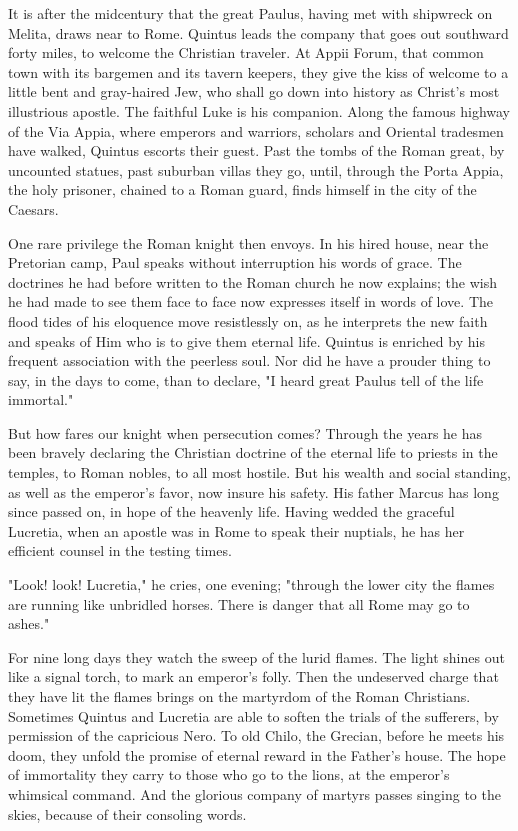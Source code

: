 It is after the midcentury that the great Paulus, having met with
shipwreck on Melita, draws near to Rome.  Quintus leads the company
that goes out southward forty miles, to welcome the Christian
traveler.   At Appii Forum, that common town with its bargemen and
its tavern keepers, they give the kiss of welcome to a little bent
and gray-haired Jew, who shall go down into history as Christ's
most illustrious apostle.  The faithful Luke is his companion.
Along the famous highway of the Via Appia, where emperors and
warriors, scholars and Oriental tradesmen have walked, Quintus
escorts their guest.  Past the tombs of the Roman great, by
uncounted statues, past suburban villas they go, until, through the
Porta Appia, the holy prisoner, chained to a Roman guard, finds
himself in the city of the Caesars.

One rare privilege the Roman knight then envoys.  In his hired
house, near the Pretorian camp, Paul speaks without interruption
his words of grace.  The doctrines he had before written to the
Roman church he now explains; the wish he had made to see them face
to face now expresses itself in words of love.  The flood tides of
his eloquence move resistlessly on, as he interprets the new faith
and speaks of Him who is to give them eternal life.  Quintus is
enriched by his frequent association with the peerless soul.  Nor
did he have a prouder thing to say, in the days to come, than to
declare, "I heard great Paulus tell of the life immortal."

But how fares our knight when persecution comes?  Through the years
he has been bravely declaring the Christian doctrine of the eternal
life to priests in the temples, to Roman nobles, to all most
hostile.  But his wealth and social standing, as well as the
emperor's favor, now insure his safety.  His father Marcus has long
since passed on, in hope of the heavenly life.  Having wedded the
graceful Lucretia, when an apostle was in Rome to speak their
nuptials, he has her efficient counsel in the testing times.

"Look! look! Lucretia," he cries, one evening; "through the lower
city the flames are running like unbridled horses.  There is danger
that all Rome may go to ashes."

For nine long days they watch the sweep of the lurid flames.  The
light shines out like a signal torch, to mark an emperor's folly.
Then the undeserved charge that they have lit the flames brings on
the martyrdom of the Roman Christians.  Sometimes Quintus and
Lucretia are able to soften the trials of the sufferers, by
permission of the capricious Nero.  To old Chilo, the Grecian,
before he meets his doom, they unfold the promise of eternal reward
in the Father's house.  The hope of immortality they carry to those
who go to the lions, at the emperor's whimsical command.  And the
glorious company of martyrs passes singing to the skies, because of
their consoling words.

